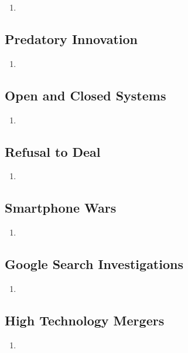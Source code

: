 \begin{enumerate}
    \item 
\end{enumerate}

\subsection{Predatory Innovation} %

\begin{enumerate}
    \item 
\end{enumerate}

\subsection{Open and Closed Systems} %

\begin{enumerate}
    \item 
\end{enumerate}

\subsection{Refusal to Deal} %

\begin{enumerate}
    \item 
\end{enumerate}

\subsection{Smartphone Wars} %

\begin{enumerate}
    \item 
\end{enumerate}

\subsection{Google Search Investigations} %

\begin{enumerate}
    \item 
\end{enumerate}

\subsection{High Technology Mergers} %

\begin{enumerate}
    \item 
\end{enumerate}
